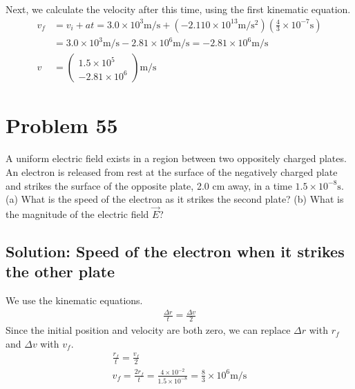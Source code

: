 \documentclass[12pt]{article}
\begin{document}
Next, we calculate the velocity after this time, using the first kinematic equation. 
\begin{align*}
    v_f &=  v_i + at
        =   3.0 \times 10^3 \unit{\meter/\second} + (-2.110 \times 10^{13} \unit{\meter/\second^2})(\frac{4}{3} \times 10^{-7} \unit{\second})\\
        &=  3.0 \times 10^3 \unit{\meter/\second} - 2.81 \times 10^6 \unit{\meter/\second}
        =   -2.81 \times 10^6 \unit{\meter/\second}\\
    v   &=  \boxed{\left(\begin{matrix} 1.5 \times 10^5 \\ -2.81 \times 10^6 \end{matrix}\right) \unit{\meter/\second}}
\end{align*}

\pagebreak
\section{Problem 55}
A uniform electric field exists in a region between two oppositely charged plates. An electron is released from rest at the surface of the negatively charged plate and strikes the surface of the opposite plate, 2.0 cm away, in a time $1.5 \times 10^{-8} \unit{\second}$. (a) What is the speed of the electron as it strikes the second plate? (b) What is the magnitude of the electric field $\vec{E}$?

\subsection{Solution: Speed of the electron when it strikes the other plate}
We use the kinematic equations.
\begin{gather*}
    \frac{\Delta r}{t} = \frac{\Delta v}{2}
\end{gather*}
Since the initial position and velocity are both zero, we can replace $\Delta r$ with $r_f$ and $\Delta v$ with $v_f$.
\begin{gather*}
    \frac{r_f}{t}   =   \frac{v_f}{2}\\
    v_f =   \frac{2r_f}{t}
        =   \frac{4 \times 10^{-2}}{1.5 \times 10^{-8}}
        =   \boxed{\frac{8}{3} \times 10^6 \unit{\meter/\second}}
\end{gather*}
\end{document}

